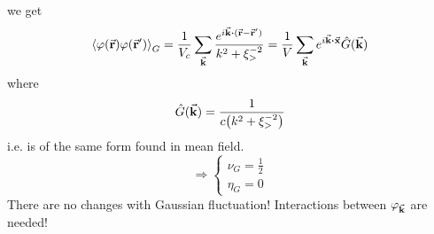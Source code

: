 \documentclass[../main/main.tex]{subfiles}
\begin{document}
we get
\begin{equation}
    \expval{\varphi (\va{r}) \varphi (\va{r}')}_G = \frac{1}{V_c} \sum_{\va{k}}^{} \frac{ e^{i \va{k}\vdot ( \va{r} - \va{r}' )} }{k^2 + \xi _>^{-2}}
    = \frac{1}{V} \sum_{\va{k}}^{} e^{i \va{k} \vdot \va{x}} \hat{G} (\va{k})
\end{equation}
where
\begin{equation}
  \hat{G} (\va{k}) = \frac{1}{c \qty(k^2 + \xi _>^{-2}) }
\end{equation}
i.e. is of the same form found in mean field.
\begin{equation}
\Rightarrow
  \begin{cases}
   \nu _G = \frac{1}{2}\\
   \eta_G = 0
  \end{cases}
\end{equation}
There are no changes with Gaussian fluctuation! Interactions between \( \varphi _{\va{k}} \) are needed!
\end{document}
